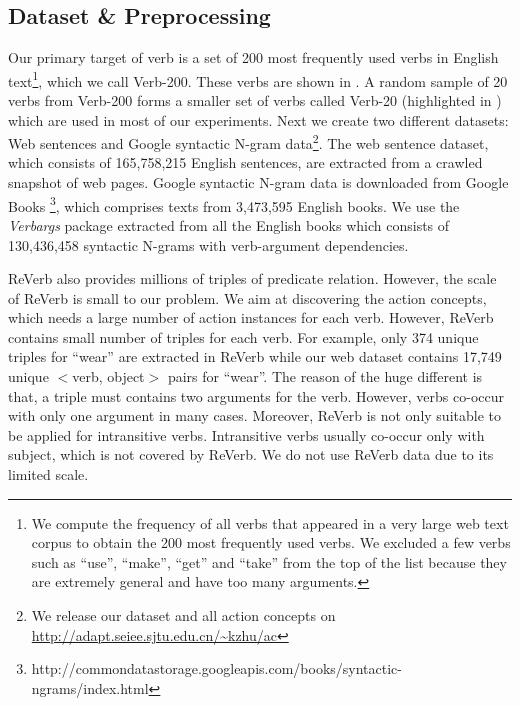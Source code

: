 \subsection{Dataset \& Preprocessing}
\label{sec:preprocess}
Our primary target of verb is a set of 200 most frequently used verbs in
English text\footnote{We compute the frequency of all verbs that appeared
in a very large web text corpus to obtain the 200 most frequently used
verbs. We excluded a few verbs such as ``use'', ``make'', ``get'' and
``take'' from the top of the list because they are extremely general and
have too many arguments.},
which we call Verb-200. These verbs are shown in . A random
sample of 20 verbs from Verb-200 forms a smaller set of verbs called Verb-20
(highlighted in ) which are used in most of our experiments.
Next we create two different datasets: Web sentences and
Google syntactic N-gram data\cite{goldberg2013}\footnote{We release our dataset
 and all action concepts on \url{http://adapt.seiee.sjtu.edu.cn/~kzhu/ac}}.
The web sentence dataset, which consists of 165,758,215 English
sentences, are extracted from a crawled snapshot of web pages.
Google syntactic N-gram data is downloaded from Google Books
\footnote{http://commondatastorage.googleapis.com/books/syntactic-ngrams/index.html},
 which comprises texts from 3,473,595 English books. We use the \emph{Verbargs}
 package extracted from all the English books which consists of 130,436,458
 syntactic N-grams with verb-argument dependencies.

ReVerb also provides millions of triples of predicate relation. However,
the scale of ReVerb is small to our problem. We aim at discovering
the action concepts, which needs a large number of action instances
for each verb. However, ReVerb contains small number of triples for each verb.
For example, only 374 unique triples for ``wear'' are
extracted in ReVerb while our web dataset contains 17,749 unique $<$verb, object$>$ pairs
for ``wear''. The reason of the huge different is that,
a triple must contains two arguments for the verb. However, verbs co-occur with
only one argument in many cases. Moreover, ReVerb is not only suitable to be applied for
intransitive verbs.
Intransitive verbs usually co-occur only with subject,
which is not covered by ReVerb. We do not use ReVerb data due to its limited scale.

